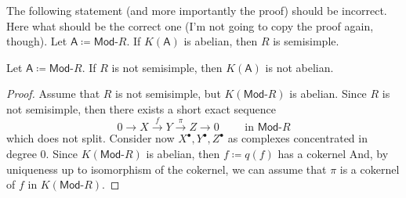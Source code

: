\begin{prop}
	The following statement (and more importantly the proof)
	should be incorrect. 
	Here what should be the correct one
	(I'm not going to copy the proof again, though).
	Let $\mathsf{A} \coloneqq \mathsf{Mod}\text{-}R$.
	If $K(\mathsf{A})$ is abelian, then
	$R$ is semisimple.
\end{prop}
\begin{prop}
	Let $\mathsf{A} \coloneqq \mathsf{Mod}\text{-}R$.
	If $R$ is not semisimple, then $K(\mathsf{A})$ is not abelian.
\end{prop}
\begin{proof}
	Assume that $R$ is not semisimple, but $K(\mathsf{Mod}\text{-}R)$ is abelian.
	Since $R$ is not semisimple, then there exists a short exact sequence
	\begin{equation}\label{eqn:sesAbHomCat}
	0 \to X \xrightarrow{f} Y \xrightarrow{\pi}
	Z \to 0 \qquad \text{ in } \mathsf{Mod}\text{-}R
	\end{equation} 
	which does not split.
	Consider now $X^\bullet, Y^\bullet, Z^\bullet$ as complexes concentrated in degree $0$.
	Since $K(\mathsf{Mod}\text{-}R)$ is abelian, then  $f\coloneqq q(f)$ has a cokernel
	And, by uniqueness up to isomorphism of the cokernel,
	we can assume that $\pi$ is a cokernel of $f$ in $K(\mathsf{Mod}\text{-}R)$.


\end{proof}
